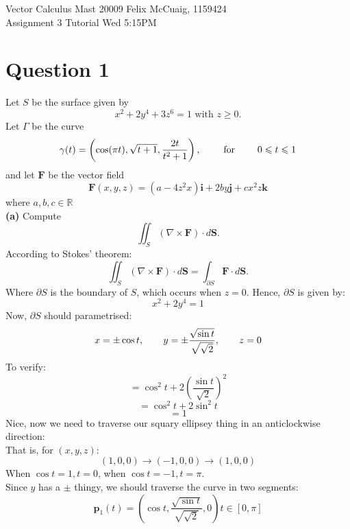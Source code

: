 \documentclass[12pt]{article}
\newcommand{\vect}[1]{\boldsymbol{#1}}
\begin{document}
Vector Calculus Mast 20009 \hfill Felix McCuaig, 1159424 \\
Assignment 3 \hfill Tutorial Wed 5:15PM
\section*{Question 1}
Let $S$ be the surface given by
$$
x^2+2y^4+3z^6=1 \text{ with } z \geqslant 0.
$$
Let $\Gamma$ be the curve
$$
\gamma (t)= \left( \cos(\pi t) , \sqrt{t+1}, \frac{2t}{t^2+1} \right), \hspace{20px} \text{ for } \hspace{20px}  0 \leqslant t \leqslant 1
$$
and let $\mathbf{F}$ be the vector field 
$$
\mathbf{F}(x,y,z)=(a-4z^2x)\vect{i}+2by\vect{j}+cx^2z\vect{k}
$$
where $a,b,c \in \mathbb{R}$\\
\medskip
\textbf{(a)} Compute
$$
\iint_{S}(\nabla \times \mathbf{F})\cdot d \vect{S}.
$$
According to Stokes' theorem:
$$
\iint_{S}(\nabla \times \mathbf{F})\cdot d \vect{S}=\int_{\partial S}\mathbf{F}\cdot d \vect{S}.
$$
Where $\partial S$ is the boundary of $S$, which occurs when $z = 0$. Hence, $\partial S$ is given by:
$$
x^2+2y^4=1
$$
Now, $\partial S$ should parametrised:\\
$$
x = \pm \cos t, \hspace{20px} y = \pm \frac{\sqrt{\sin t}}{\sqrt{\sqrt{2}}}, \hspace{20px} z = 0
$$
To verify:
$$
=\cos^2 t + 2 \left( \frac{\sin t}{\sqrt{2}} \right)^2
$$
$$
=\cos^2 t + 2 \sin^2 t
$$
$$
=1
$$
Nice, now we need to traverse our squary ellipsey thing in an anticlockwise direction: \\
\smallskip
That is, for $(x, y, z):$
$$(1,0,0)\rightarrow(-1,0,0)\rightarrow(1,0,0)$$
When $\cos t = 1, t = 0$, when $\cos t = -1, t = \pi$. \\
Since $y$ has a $\pm$ thingy, we should traverse the curve in two segments: \\
$$
\mathbf{p}_1(t)=\left(\cos t, \frac{\sqrt{\sin t}}{\sqrt{\sqrt{2}}} , 0\right) t \in [0, \pi]
$$
\end{document}
